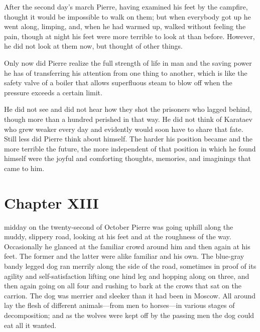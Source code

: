 After the second day's march Pierre, having examined his feet by
the campfire, thought it would be impossible to walk on them; but
when everybody got up he went along, limping, and, when he had
warmed up, walked without feeling the pain, though at night his
feet were more terrible to look at than before. However, he did
not look at them now, but thought of other things.

Only now did Pierre realize the full strength of life in man and
the saving power he has of transferring his attention from one
thing to another, which is like the safety valve of a boiler that
allows superfluous steam to blow off when the pressure exceeds a
certain limit.

He did not see and did not hear how they shot the prisoners who
lagged behind, though more than a hundred perished in that
way. He did not think of Karataev who grew weaker every day and
evidently would soon have to share that fate. Still less did
Pierre think about himself. The harder his position became and
the more terrible the future, the more independent of that
position in which he found himself were the joyful and comforting
thoughts, memories, and imaginings that came to him.


\chapter*{Chapter XIII} \ifaudio {}
\fi

 midday on the twenty-second of October Pierre was going uphill
along the muddy, slippery road, looking at his feet and at the
roughness of the way. Occasionally he glanced at the familiar
crowd around him and then again at his feet. The former and the
latter were alike familiar and his own. The blue-gray bandy
legged dog ran merrily along the side of the road, sometimes in
proof of its agility and self-satisfaction lifting one hind leg
and hopping along on three, and then again going on all four and
rushing to bark at the crows that sat on the carrion. The dog was
merrier and sleeker than it had been in Moscow. All around lay
the flesh of different animals---from men to horses---in various
stages of decomposition; and as the wolves were kept off by the
passing men the dog could eat all it wanted.


